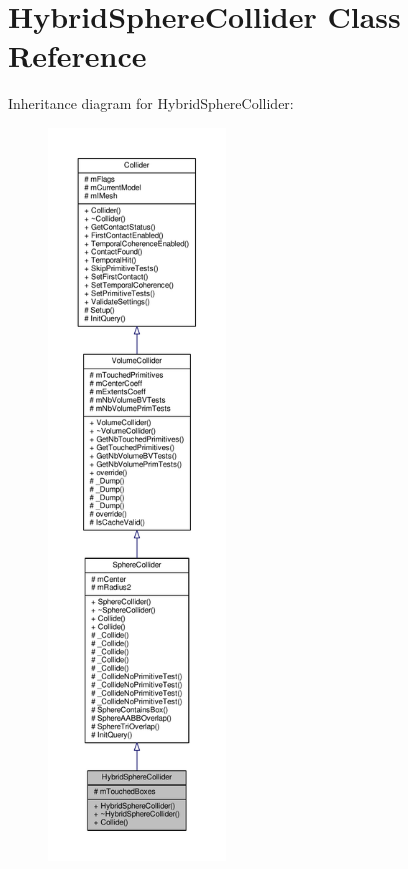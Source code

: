 \hypertarget{classHybridSphereCollider}{}\section{Hybrid\+Sphere\+Collider Class Reference}
\label{classHybridSphereCollider}


Inheritance diagram for Hybrid\+Sphere\+Collider\+:
\nopagebreak
\begin{figure}[H]
\begin{center}
\leavevmode
\includegraphics[height=550pt]{d3/d49/classHybridSphereCollider__inherit__graph}
\end{center}
\end{figure}



